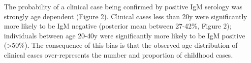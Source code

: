 The probability of a clinical case being confirmed by positive IgM
serology was strongly age dependent (Figure 2). Clinical cases less than
20y were significantly more likely to be IgM negative (posterior mean
between 27-42\%, Figure 2); individuals between age 20-40y were
significantly more likely to be IgM positive (\textgreater{}50\%). The consequence of this bias is that the observed age distribution
of clinical cases over-represents the number and proportion of childhood cases.